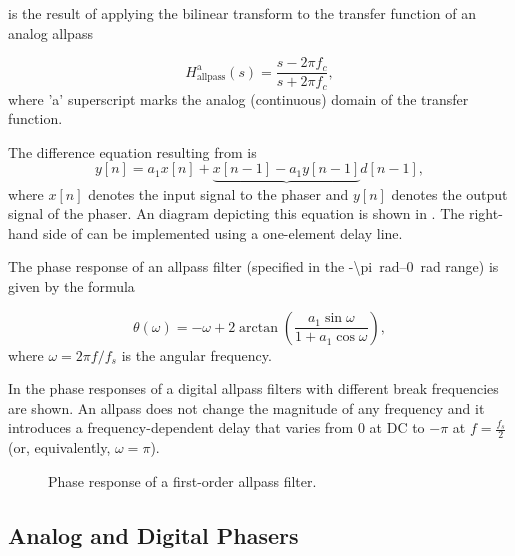  is the result of applying the bilinear transform to the transfer function of an analog allpass

\begin{equation}
    H_{\text{allpass}}^{\text{a}} (s) = \frac{s - 2\pi f_c}{s + 2\pi f_c},
\end{equation}
where 'a' superscript marks the analog (continuous) domain of the transfer function.

The difference equation resulting from  is
\begin{equation}
    y[n] = a_1 x[n] + \underbrace{x[n-1] - a_1 y[n-1]}{d[n-1]},
    \label{eq:allpass_filter_difference_equation}
\end{equation}
where $x[n]$ denotes the input signal to the phaser and $y[n]$ denotes the output signal of the phaser. An diagram depicting this equation is shown in . The right-hand side of  can be implemented using a one-element delay line.


The phase response of an allpass filter (specified in the \SIrange{-\pi}{0}{rad} range) is given by the formula \cite{Kiiski2016}

\begin{equation}
    \theta (\omega) = - \omega + 2 \arctan \left( \frac{a_1 \sin \omega}{1 + a_1 \cos \omega} \right),
\end{equation}
where $\omega = 2 \pi f / f_s$ is the angular frequency.

In  the phase responses of a digital allpass filters with different break frequencies are shown. An allpass does not change the magnitude of any frequency and it introduces a frequency-dependent delay that varies from 0 at DC to $-\pi$ at $f = \frac{f_s}{2}$ (or, equivalently, $\omega = \pi$). 

\begin{figure}
    \centering
    
    \caption{Phase response of a first-order allpass filter.}
    \label{fig:phase_response_allpass_filter}
\end{figure}

\subsection{Analog and Digital Phasers}

